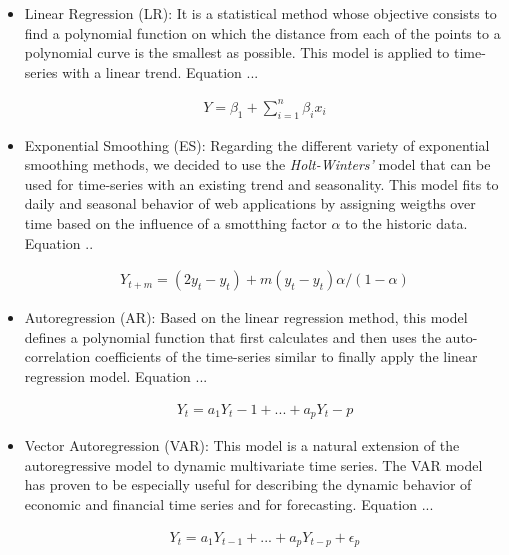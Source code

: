 \begin{itemize}
\item Linear Regression (LR): It is a statistical method whose objective consists to find a polynomial function on which the distance from each of the points to a polynomial curve is the smallest as possible. This model is applied to time-series with a linear trend. Equation ...

\begin{equation}\label{xx}
\begin{split}
Y = {\beta}_1 +  \sum_{i=1}^n {\beta}_i x_i 
\end{split}
\end{equation}

\item Exponential Smoothing (ES): Regarding the different variety of exponential smoothing methods, we decided to use the \emph{Holt-Winters'} model that can be used for time-series with an existing trend and seasonality. This model fits to daily and seasonal behavior of web applications by assigning weigths over time based on the influence of a smotthing factor \emph{$\alpha$} to the historic data. Equation ..

\begin{equation}\label{xx}
\begin{split}
Y_{t+m} = (2y_t - y_t) + m(y_t - y_t) \alpha / (1 - \alpha) 
\end{split}
\end{equation}

\item Autoregression (AR): Based on the linear regression method, this model defines a polynomial function that first calculates and then uses the auto-correlation coefficients of the time-series similar to finally apply the linear regression model. Equation ...

\begin{equation}\label{xx}
\begin{split}
Y_t =a_1 Y_t-1 + ... + a_p Y_t-p 
\end{split}
\end{equation}


\item Vector Autoregression (VAR): This model is a natural extension of the  autoregressive model to dynamic multivariate time series. The VAR model has proven to be especially useful for describing the dynamic behavior of economic and financial time series and for forecasting. Equation ...

\begin{equation}\label{xx}
\begin{split}
Y_{t} =a_1 Y_{t-1} + ... + a_p Y_{t-p} + {\epsilon}_p
\end{split}
\end{equation}



\end{itemize}

